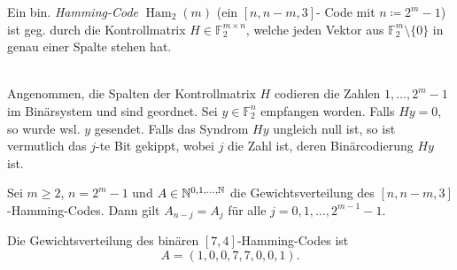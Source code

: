 \documentclass{cheat-sheet}
\newcommand{\F}{\mathbb{F}} %
\DeclareMathOperator{\Ham}{Ham} %
\begin{document}

\begin{konstr}
  Ein bin. \emph{Hamming-Code} $\Ham_2(m)$ (ein $[n, n {-} m, 3]$- Code mit $n \coloneqq 2^m - 1$) ist geg. durch die Kontrollmatrix $H \in \F_2^{m \times n}$, welche jeden Vektor aus $\F_2^m \setminus \{ 0 \}$ in genau einer Spalte stehen hat.
\end{konstr}

\begin{alg}\mbox{}\\
  Angenommen, die Spalten der Kontrollmatrix $H$ codieren die Zahlen $1, \ldots, 2^m - 1$ im Binärsystem und sind geordnet.
  Sei $y \in \F_2^n$ empfangen worden.
  Falls $Hy = 0$, so wurde wsl. $y$ gesendet.
  Falls das Syndrom $Hy$ ungleich null ist, so ist vermutlich das $j$-te Bit gekippt, wobei $j$ die Zahl ist, deren Binärcodierung $Hy$ ist.
\end{alg}


\begin{prop}
  Sei $m \geq 2$, $n = 2^m - 1$ und $A \in \mathbb{N}^{0, 1, \ldots, \mathbb{N}}$ die Gewichtsverteilung des $[n, n - m, 3]$-Hamming-Codes.
  Dann gilt $A_{n-j} = A_j$ für alle $j = 0, 1, \ldots, 2^{m-1} - 1$.
\end{prop}

\begin{satz}
  Die Gewichtsverteilung des binären $[7,4]$-Hamming-Codes ist
  \[ A = (1, 0, 0, 7, 7, 0, 0, 1). \]
\end{satz}
\end{document}
